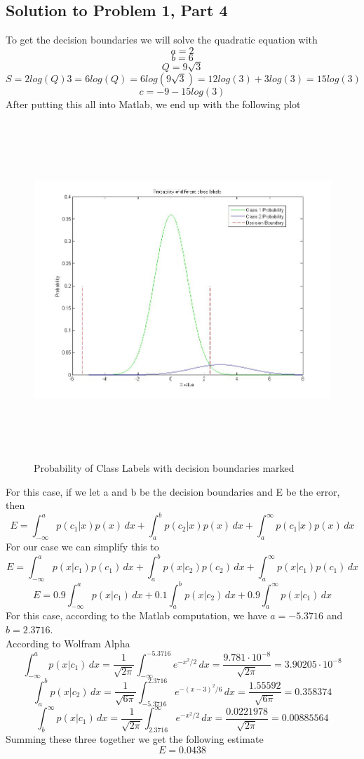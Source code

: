 \documentclass[11pt,psfig]{article}
\begin{document}
\subsection*{Solution to Problem 1, Part 4}

To get the decision boundaries we will solve the quadratic equation with
\[
a = 2
\]
\[
b = 6
\]
\[
Q = 9 \sqrt{3}
\]
\[
S = 2 log(Q) 3 = 6 log(Q) = 6log( 9 \sqrt{3}) = 12 log(3) + 3 log(3) = 15 log(3)
\]
\[
c = -9 - 15 log(3)
\]
After putting this all into Matlab, we end up with the following plot
\begin{figure}[H]
\centering
\includegraphics[height=5in]{prob1part2plot.jpg}
\caption{Probability of Class Labels with decision boundaries marked}
\end{figure}

For this case, if we let a and b be the decision boundaries and E be the error, then
\[
E = \int_{-\infty}^{a}{p(c_1|x)p(x) \, dx} + \int_{a}^{b}{p(c_2|x)p(x) \, dx} + \int_{a}^{\infty}{p(c_1|x)p(x) \, dx}
\]
For our case we can simplify this to
\[
E = \int_{-\infty}^{a}{p(x|c_1)p(c_1) \, dx} + \int_{a}^{b}{p(x|c_2)p(c_2) \, dx} + \int_{a}^{\infty}{p(x|c_1)p(c_1) \, dx}
\]
\[
E = 0.9\int_{-\infty}^{a}{p(x|c_1) \, dx} + 0.1\int_{a}^{b}{p(x|c_2) \, dx} + 0.9\int_{a}^{\infty}{p(x|c_1) \, dx}
\]
For this case, according to the Matlab computation, we have $a=-5.3716$ and $b=2.3716$. \\
According to Wolfram Alpha
\[
\int_{-\infty}^{a}{p(x|c_1) \, dx} = \frac{1}{\sqrt{2\pi}} \int_{-\infty}^{-5.3716}{e^{-x^2/2} \, dx} = \frac{9.781 \cdot 10^{-8}}{\sqrt{2\pi}} = 3.90205 \cdot 10^{-8}
\]
\[
\int_{a}^{b}{p(x|c_2) \, dx} = \frac{1}{\sqrt{6\pi}} \int_{-5.3716}^{2.3716}{e^{-(x-3)^2/6} \, dx} = \frac{1.55592}{\sqrt{6\pi}} = 0.358374
\]
\[
\int_{b}^{\infty}{p(x|c_1) \, dx} = \frac{1}{\sqrt{2\pi}} \int_{2.3716}^{\infty}{e^{-x^2/2} \, dx} = \frac{0.0221978}{\sqrt{2\pi}} = 0.00885564
\]
Summing these three together we get the following estimate
\[
E = 0.0438
\]
\end{document}
